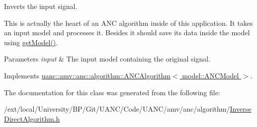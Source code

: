 Inverts the input signal. 

This is actually the heart of an A\+NC algorithm inside of this application. It takes an input model and processes it. Besides it should save its data inside the model using \hyperlink{classuanc_1_1amv_1_1anc_1_1algorithm_1_1_a_n_c_algorithm_a12ce80f6746cbb440cf771fc6878f7cf}{get\+Model()}.


\begin{DoxyParams}{Parameters}
{\em input} & The input model containing the original signal. \\
\hline
\end{DoxyParams}


Implements \hyperlink{classuanc_1_1amv_1_1anc_1_1algorithm_1_1_a_n_c_algorithm_abfdc7f14f7e41e408ee08037a839760d}{uanc\+::amv\+::anc\+::algorithm\+::\+A\+N\+C\+Algorithm$<$ model\+::\+A\+N\+C\+Model $>$}.



The documentation for this class was generated from the following file\+:\begin{DoxyCompactItemize}
\item 
/ext/local/\+University/\+B\+P/\+Git/\+U\+A\+N\+C/\+Code/\+U\+A\+N\+C/amv/anc/algorithm/\hyperlink{_inverse_direct_algorithm_8h}{Inverse\+Direct\+Algorithm.\+h}\end{DoxyCompactItemize}
